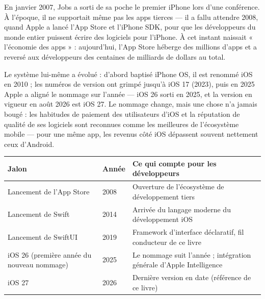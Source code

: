 


En janvier 2007, Jobs a sorti de sa poche le premier iPhone lors d’une conférence. À l’époque, il ne supportait même pas les apps tierces — il a fallu attendre 2008, quand Apple a lancé l’App Store et l’iPhone SDK, pour que les développeurs du monde entier puissent écrire des logiciels pour l’iPhone. À cet instant naissait « l’économie des apps » : aujourd’hui, l’App Store héberge des millions d’apps et a reversé aux développeurs des centaines de milliards de dollars au total.

Le système lui-même a évolué : d’abord baptisé iPhone OS, il est renommé iOS en 2010 ; les numéros de version ont grimpé jusqu’à iOS 17 (2023), puis en 2025 Apple a aligné le nommage sur l’année — iOS 26 sorti en 2025, et la version en vigueur en août 2026 est iOS 27. Le nommage change, mais une chose n’a jamais bougé : les habitudes de paiement des utilisateurs d’iOS et la réputation de qualité de ses logiciels sont reconnues comme les meilleures de l’écosystème mobile — pour une même app, les revenus côté iOS dépassent souvent nettement ceux d’Android.

\begin{center}
\begin{tabularx}{\linewidth}{|X|X|X|}
\hline
\textbf{Jalon} & \textbf{Année} & \textbf{Ce qui compte pour les développeurs} \tabularnewline
\hline
Lancement de l’App Store & 2008 & Ouverture de l’écosystème de développement tiers \tabularnewline
Lancement de Swift & 2014 & Arrivée du langage moderne du développement iOS \tabularnewline
Lancement de SwiftUI & 2019 & Framework d’interface déclaratif, fil conducteur de ce livre \tabularnewline
iOS 26 (première année du nouveau nommage) & 2025 & Le nommage suit l’année ; intégration générale d’Apple Intelligence \tabularnewline
iOS 27 & 2026 & Dernière version en date (référence de ce livre) \tabularnewline
\hline
\end{tabularx}
\end{center}

